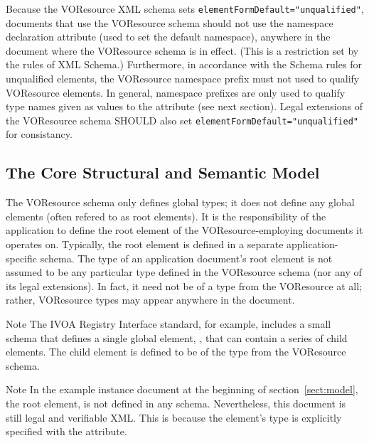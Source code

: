 \documentclass[11pt,a4paper]{ivoa}
\begin{document}
Because the VOResource XML schema sets
\verb|elementFormDefault="unqualified"|, documents that use the
VOResource schema should not use the namespace declaration attribute
 (used to set the default namespace), anywhere in
the document where the VOResource schema is in effect.  (This is a
restriction set by the rules of XML Schema.)  Furthermore, in
accordance with the Schema rules for unqualified elements, the
VOResource namespace prefix must not used to qualify VOResource
elements.  In general, namespace prefixes are only used to qualify
type names given as values to the  attribute (see
next section).  Legal extensions of the VOResource schema SHOULD also
set \verb|elementFormDefault="unqualified"| for consistancy.



\subsection{The Core Structural and Semantic Model}
\label{sect:core}

The VOResource schema only defines global types; it does not define
any global elements (often refered to as root elements).  It is the
responsibility of the application to define the root element of the
VOResource-employing documents it operates on.  Typically, the root
element is defined in a separate application-specific schema.  The
type of an application document's root element is not assumed to be
any particular type defined in the VOResource schema (nor any of its
legal extensions).  In fact, it need not be of a type from the
VOResource at all; rather, VOResource types may appear anywhere in the
document.   



\begin{admonition}{Note}
The IVOA Registry Interface standard, for example, includes a
small schema that defines a single global element,
, that can contain a series of
 child elements.  The child
element is defined to be of the type  from
the VOResource schema.
\end{admonition}

\begin{admonition}{Note}
In the example instance
document at the beginning of section~\ref{sect:model}, the root element,
 is not defined in any schema.
Nevertheless, this document is still legal and verifiable XML.
This is because the element's type is explicitly specified with
the  attribute.
\end{admonition}
\end{document}

